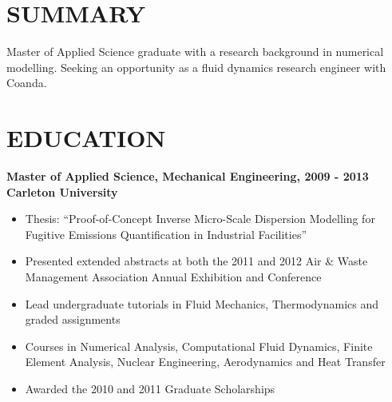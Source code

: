 \documentclass[letterpaper]{res}
\begin{document}
 
\renewcommand{\labelitemi}{$\vcenter{\hbox{\tiny$\bullet$}}$}
\begin{resume} 
\section{SUMMARY}
\vspace{10pt}
Master of Applied Science graduate with a research background in numerical modelling. Seeking an opportunity as a fluid dynamics research engineer with Coanda. 
 
\section{EDUCATION}
\vspace{10pt}
{\bf Master of Applied Science, Mechanical Engineering, \hfill 2009 - 2013}\\
{\bf Carleton University}
\begin{itemize} \itemsep -2pt
\item Thesis: ``Proof-of-Concept Inverse Micro-Scale Dispersion Modelling for Fugitive Emissions Quantification in Industrial Facilities''
\item Presented extended abstracts at both the 2011 and 2012 Air \& Waste Management Association Annual Exhibition and Conference
\item Lead undergraduate tutorials in Fluid Mechanics, Thermodynamics and graded assignments
\item Courses in Numerical Analysis, Computational Fluid Dynamics, Finite Element Analysis, Nuclear Engineering, Aerodynamics and Heat Transfer
\item Awarded the 2010 and 2011 Graduate Scholarships
\end{itemize}


\end{resume}
\end{document}
